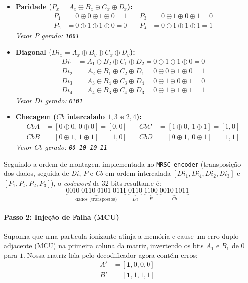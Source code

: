 \documentclass[12pt,a4paper]{article}
\begin{document}
\begin{itemize}
    \item \textbf{Paridade ($P_x = A_x \oplus B_x \oplus C_x \oplus D_x$):}
    \begin{align*}
        P_1 &= 0 \oplus 0 \oplus 1 \oplus 0 = 1 \quad & P_3 &= 0 \oplus 1 \oplus 0 \oplus 1 = 0 \\
        P_2 &= 0 \oplus 1 \oplus 1 \oplus 0 = 0 \quad & P_4 &= 0 \oplus 1 \oplus 1 \oplus 1 = 1 
    \end{align*}
    \textit{Vetor $P$ gerado: \texttt{1001}}

    \item \textbf{Diagonal ($Di_x = A_x \oplus B_y \oplus C_x \oplus D_y$):}
    \begin{align*}
        Di_1 &= A_1 \oplus B_2 \oplus C_1 \oplus D_2 = 0 \oplus 1 \oplus 1 \oplus 0 = 0 \\
        Di_2 &= A_2 \oplus B_1 \oplus C_2 \oplus D_1 = 0 \oplus 0 \oplus 1 \oplus 0 = 1 \\
        Di_3 &= A_3 \oplus B_4 \oplus C_3 \oplus D_4 = 0 \oplus 1 \oplus 0 \oplus 1 = 0 \\
        Di_4 &= A_4 \oplus B_3 \oplus C_4 \oplus D_3 = 0 \oplus 1 \oplus 1 \oplus 1 = 1 
    \end{align*}
    \textit{Vetor $Di$ gerado: \texttt{0101}}

    \item \textbf{Checagem ($Cb$ intercalado $1,3$ e $2,4$):}
    \begin{align*}
        CbA &= [0 \oplus 0, \: 0 \oplus 0] = [0, 0] \quad & CbC &= [1 \oplus 0, \: 1 \oplus 1] = [1, 0] \\
        CbB &= [0 \oplus 1, \: 1 \oplus 1] = [1, 0] \quad & CbD &= [0 \oplus 1, \: 0 \oplus 1] = [1, 1] 
    \end{align*}
    \textit{Vetor $Cb$ gerado: \texttt{00 10 10 11}}
\end{itemize}

Seguindo a ordem de montagem implementada no \texttt{MRSC\_encoder} 
(transposição dos dados, seguida de $Di$, $P$ e $Cb$ em ordem intercalada 
$[Di_1,Di_4,Di_2,Di_3]$ e $[P_1,P_4,P_2,P_3]$), o \textit{codeword} de 32 
bits resultante é:
\begin{equation*}
    \underbrace{0010\;0110\;0101\;0111}_{\text{dados (transpostos)}}\;
    \underbrace{0110}_{Di}\;\underbrace{1100}_{P}\;
    \underbrace{0010\;1011}_{Cb}
\end{equation*}

\paragraph{Passo 2: Injeção de Falha (MCU)}
Suponha que uma partícula ionizante atinja a memória e cause um erro duplo adjacente (MCU) na primeira coluna da matriz, invertendo os bits $A_1$ e $B_1$ de $0$ para $1$. 
Nossa matriz lida pelo decodificador agora contém erros:
\begin{align*}
    A' &= [\mathbf{1}, 0, 0, 0] \\
    B' &= [\mathbf{1}, 1, 1, 1] 
\end{align*}
\end{document}
